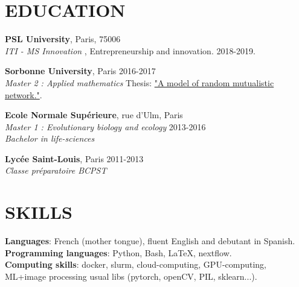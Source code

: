 \documentclass[margin]{res}
\begin{document}
\begin{resume}



\section{EDUCATION}
\textbf{PSL University}, Paris, 75006\\
{\sl ITI - MS Innovation }, Entrepreneurship and innovation. \hfill 2018-2019.
\par
\textbf{Sorbonne University}, Paris  \hfill 2016-2017\\
{\sl Master 2 : Applied mathematics}
Thesis: \href{https://drive.google.com/file/d/16VLpiMhV8CecNDiYf85nuo1kFdp9lQAF/view?usp=sharing}{"A model of random mutualistic network."}. 
\par
\textbf{Ecole Normale Supérieure}, rue d'Ulm, Paris\\
{\sl Master 1 : Evolutionary biology and ecology} \hfill 2013-2016 \\
{\sl Bachelor in life-sciences} 
\par 
\textbf{Lycée Saint-Louis}, Paris \hfill 2011-2013\\
{\sl Classe préparatoire BCPST} 




\section{SKILLS}
\textbf{Languages}: French (mother tongue), fluent English and debutant in Spanish.
\\
\textbf{Programming languages}: Python, Bash, \LaTeX, nextflow. 
\\
\textbf{Computing skills}: docker, slurm, cloud-computing, GPU-computing, 
ML+image processing usual libs (pytorch, openCV, PIL, sklearn...).
\\



\end{resume}
\end{document}
